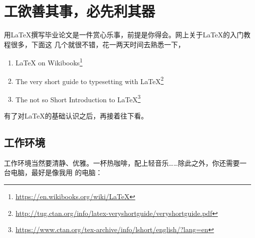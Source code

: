 \chapter{工欲善其事，必先利其器}
\label{cha:pre-requisite}

用\LaTeX{}撰写毕业论文是一件赏心乐事，前提是你得会。网上关于\LaTeX{}的入门教程很多，下面这
几个就很不错，花一两天时间去熟悉一下，

\begin{enumerate}
\item \LaTeX{} on Wikibooks\footnote{\url{https://en.wikibooks.org/wiki/LaTeX}}
\item The very short guide to typesetting with
  \LaTeX{}\footnote{\url{http://tug.ctan.org/info/latex-veryshortguide/veryshortguide.pdf}}
\item The not so Short Introduction to
  \LaTeX{}\footnote{\url{https://www.ctan.org/tex-archive/info/lshort/english/?lang=en}}
\end{enumerate}
有了对\LaTeX{}的基础认识之后，再接着往下看。

\section{工作环境}
\label{sec:env}

工作环境当然要清静、优雅。一杯热咖啡，配上轻音乐……除此之外，你还需要一台电脑，最好是像我用
的电脑：


